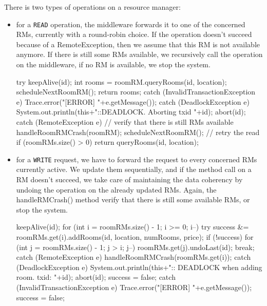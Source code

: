 \documentclass[a4paper]{article}
\begin{document}
There is two types of operations on a resource manager:
\begin{itemize}
\item
for a \texttt{READ} operation, the middleware forwards it to one of the concerned RMs, currently with a round-robin choice. If the operation doesn't succeed because of a RemoteException, then we assume that this RM is not available anymore. If there is still some RMs available, we recursively call the operation on the middleware, if no RM is available, we stop the system.

\begin{javacode}
    try {
      keepAlive(id);
      int rooms = roomRM.queryRooms(id, location);
      scheduleNextRoomRM();
      return rooms;
    } catch (InvalidTransactionException e) {
      Trace.error("[ERROR] "+e.getMessage());
    } catch (DeadlockException e) {
      System.out.println(this+"::DEADLOCK. Aborting txid "+id);
      abort(id);
    } catch (RemoteException e){
      // verify that there is still RMs available
      handleRoomRMCrash(roomRM);
      scheduleNextRoomRM();
      // retry the read
      if (roomRMs.size() > 0)
        return queryRooms(id, location);
    }    
\end{javacode}

\item
for a \texttt{WRITE} request, we have to forward the request to every concerned RMs currently active. We update them sequentially, and if the method call on a RM doesn't succeed, we take care of maintaining the data coherency by undoing the operation on the already updated RMs. Again, the handleRMCrash() method verify that there is still some available RMs, or stop the system.
\begin{javacode}
    keepAlive(id);
    for (int i = roomRMs.size() - 1; i >= 0; i--){
      try {
        success &= roomRMs.get(i).addRooms(id, location, numRooms, price);
        if (!success){
          for (int j = roomRMs.size() - 1; j > i; j--){
            roomRMs.get(j).undoLast(id);
          }
          break;
        }
      } catch (RemoteException e){
        handleRoomRMCrash(roomRMs.get(i));
      } catch (DeadlockException e) {
        System.out.println(this+":: DEADLOCK when adding room. txid: "+id);
        abort(id);
        success = false;
      } catch (InvalidTransactionException e) {
        Trace.error("[ERROR] "+e.getMessage());
        success = false;
      }
    }
\end{javacode}
\end{itemize}
\end{document}
